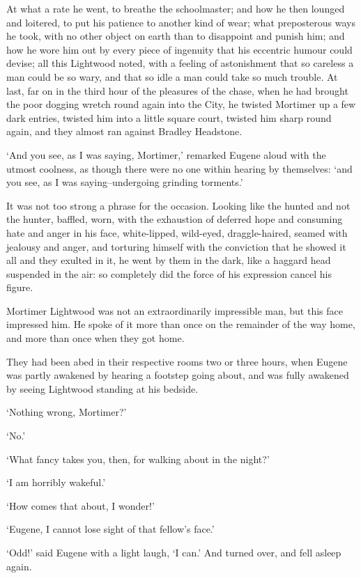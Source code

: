 At what a rate he went, to breathe the schoolmaster; and how he then
lounged and loitered, to put his patience to another kind of wear;
what preposterous ways he took, with no other object on earth than to
disappoint and punish him; and how he wore him out by every piece of
ingenuity that his eccentric humour could devise; all this Lightwood
noted, with a feeling of astonishment that so careless a man could be so
wary, and that so idle a man could take so much trouble. At last, far on
in the third hour of the pleasures of the chase, when he had brought the
poor dogging wretch round again into the City, he twisted Mortimer up
a few dark entries, twisted him into a little square court, twisted him
sharp round again, and they almost ran against Bradley Headstone.

‘And you see, as I was saying, Mortimer,’ remarked Eugene aloud with
the utmost coolness, as though there were no one within hearing
by themselves: ‘and you see, as I was saying--undergoing grinding
torments.’

It was not too strong a phrase for the occasion. Looking like the hunted
and not the hunter, baffled, worn, with the exhaustion of deferred
hope and consuming hate and anger in his face, white-lipped, wild-eyed,
draggle-haired, seamed with jealousy and anger, and torturing himself
with the conviction that he showed it all and they exulted in it, he
went by them in the dark, like a haggard head suspended in the air: so
completely did the force of his expression cancel his figure.

Mortimer Lightwood was not an extraordinarily impressible man, but this
face impressed him. He spoke of it more than once on the remainder of
the way home, and more than once when they got home.

They had been abed in their respective rooms two or three hours, when
Eugene was partly awakened by hearing a footstep going about, and was
fully awakened by seeing Lightwood standing at his bedside.

‘Nothing wrong, Mortimer?’

‘No.’

‘What fancy takes you, then, for walking about in the night?’

‘I am horribly wakeful.’

‘How comes that about, I wonder!’

‘Eugene, I cannot lose sight of that fellow’s face.’

‘Odd!’ said Eugene with a light laugh, ‘I can.’ And turned over, and
fell asleep again.



